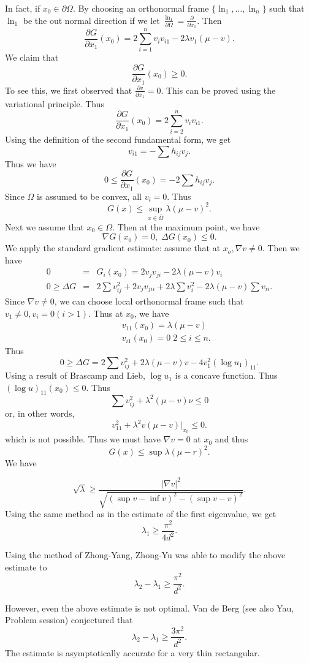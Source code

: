In fact, if $ x_0 \in \partial \Omega $. By choosing an orthonormal frame $ \{ \ln_1 , \ldots, \ln_n \} $ such that $ \ln_1$ be the out normal direction if we let $ \frac{\ln_1}{\partial \Omega} = \frac{\partial }{\partial x _1} $. Then
%
\[ \frac{\partial G}{\partial x _1} (x_0)  = 2 \sum^n_{i=1} v_i v_{i1} -  2 \lambda v _1 (\mu - v ). \]
%
We claim that
%
\[ \frac{\partial G}{\partial x _1} (x_0) \geq 0. \]
%
To see this, we first observed that $\frac{\partial v }{\partial x _1} = 0 $. This can be proved using the variational principle. Thus
%
\[\frac{\partial G}{\partial x _1} (x_0)  = 2 \sum^n_{i=2} v_i v_{i1}.\]
%
Using the definition of the second fundamental form, we get 
%
\[ v _{i1} = - \sum h_{ij} v _j .\]
%
Thus we have 
%
\[0 \leq \frac{\partial G}{\partial x _1} (x_0)  = -2 \sum   h_{ij} v_{j}.\]
%
Since $ \Omega $ is assumed to be convex, all $ v_i = 0 $. Thus 
%
\[ G(x) \leq \sup_{x \in \bar{\Omega}} \lambda ( \mu - v )^2 .\]
Next we assume that $ x_0 \in \Omega $. Then at the maximum point, we have 
%
\[ \nabla G (x_0) = 0 , \; \Delta G (x_0) \leq 0 .\]
We apply the standard gradient estimate: assume that at $ x_o, \nabla v \neq 0 $. Then we have 
%
\begin{eqnarray*}
 0 &= &G_i (x_0) = 2 v_j v_{ji} - 2  \lambda ( \mu - v ) v _i \\
0 \geq \Delta G &= &2 \sum v ^2 _{ij} + 2 v _j v_{jii} + 2 \lambda \sum v ^2_i - 2 \lambda ( \mu - v) \sum v_{ii} .
\end{eqnarray*}
%
Since $ \nabla v \neq 0 $, we can choose local orthonormal frame such that  $ v _1 \neq 0 , v _i = 0 (i > 1)$. Thus at $ x_0$, we have 
\begin{eqnarray*}
&& v _{11} (x_0) = \lambda ( \mu - v ) \\
&& v_{i1} (x_0) = 0 \;  2 \leq i \leq n .
\end{eqnarray*}
%
Thus 
%
\[ 0 \geq \Delta G = 2 \sum v^2_{ij} + 2 \lambda ( \mu - v) v - 4 v ^2_1 (\log u_1 ) _{11}.\]
%
Using a result of Brascamp and Lieb, $ \log u_1$ is a concave function. Thus $ (\log u) _{11} (x_0) \leq 0 $. Thus
%
\[ \sum v ^2 _{ij} + \lambda ^2 ( \mu - v) \nu \leq 0 \]
%
or, in other words,
%
\[ v^2_{11} + \lambda ^2 v (\mu - v ) |_{x_{0}} \leq 0 .\]
%
which is not possible. Thus we must have $ \nabla v = 0 $ at $ x_0$ and thus
%
\[ G(x) \leq \sup \lambda ( \mu - r) ^2 .\]
%
We have 
%

\[\sqrt{\lambda} \geq \frac{|\nabla v |^2}{\sqrt{(\sup v - \inf v )^2 - (\sup v - v )^2}} .\]
%
Using the same method as in the estimate of the first eigenvalue, we get 
%
\[ \lambda _1 \geq \frac{\pi^2}{4d^2}.\]
%
\begin{remark}
Using the method of Zhong-Yang, Zhong-Yu was able to modify the above estimate to 
%
\[ \lambda _2 - \lambda _1 \geq \frac{\pi^2}{d^2}.\]
\end{remark}
However, even the above estimate is not optimal. Van de Berg (see also Yau, Problem session) conjectured that 
%
\[ \lambda _2 - \lambda _1 \geq \frac{3\pi^2}{d^2}.\]
The estimate is asymptotically accurate for a very thin rectangular.


